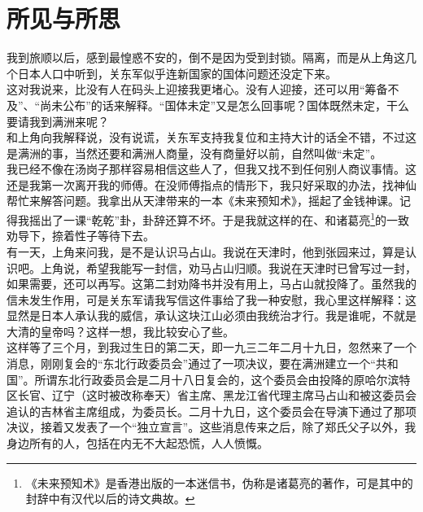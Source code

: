 \fancyhead[RO]{} %
\fancyhead[LE]{} %
\chapter*{所见与所思}
\thispagestyle{empty}
我到旅顺以后，感到最惶惑不安的，倒不是因为受到封锁。隔离，而是从上角这几个日本人口中听到，关东军似乎连新国家的国体问题还没定下来。\\

这对我说来，比没有人在码头上迎接我更堵心。没有人迎接，还可以用“筹备不及”、“尚未公布”的话来解释。“国体未定”又是怎么回事呢？国体既然未定，干么要请我到满洲来呢？\\

和上角向我解释说，没有说谎，关东军支持我复位和主持大计的话全不错，不过这是满洲的事，当然还要和满洲人商量，没有商量好以前，自然叫做“未定”。\\

我已经不像在汤岗子那样容易相信这些人了，但我又找不到任何别人商议事情。这还是我第一次离开我的师傅。在没师傅指点的情形下，我只好采取的办法，找神仙帮忙来解答问题。我拿出从天津带来的一本《未来预知术》，摇起了金钱神课。记得我摇出了一课“乾乾”卦，卦辞还算不坏。于是我就这样的在、和诸葛亮\footnote{《未来预知术》是香港出版的一本迷信书，伪称是诸葛亮的著作，可是其中的封辞中有汉代以后的诗文典故。}的一致劝导下，捺着性子等待下去。\\

有一天，上角来问我，是不是认识马占山。我说在天津时，他到张园来过，算是认识吧。上角说，希望我能写一封信，劝马占山归顺。我说在天津时已曾写过一封，如果需要，还可以再写。这第二封劝降书并没有用上，马占山就投降了。虽然我的信未发生作用，可是关东军请我写信这件事给了我一种安慰，我心里这样解释：这显然是日本人承认我的威信，承认这块江山必须由我统治才行。我是谁呢，不就是大清的皇帝吗？这样一想，我比较安心了些。\\

这样等了三个月，到我过生日的第二天，即一九三二年二月十九日，忽然来了一个消息，刚刚复会的“东北行政委员会”通过了一项决议，要在满洲建立一个“共和国”。所谓东北行政委员会是二月十八日复会的，这个委员会由投降的原哈尔滨特区长官、辽宁（这时被改称奉天）省主席、黑龙江省代理主席马占山和被这委员会追认的吉林省主席组成，为委员长。二月十九日，这个委员会在导演下通过了那项决议，接着又发表了一个“独立宣言”。这些消息传来之后，除了郑氏父子以外，我身边所有的人，包括在内无不大起恐慌，人人愤慨。\\

